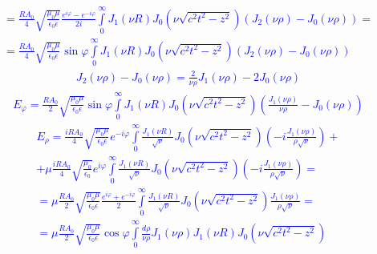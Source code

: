 %
\textcolor{blue} { \begin{equation*} \begin{aligned}
= \frac{R A_0}{4} \sqrt{\frac{\mu_0 \mu}{\epsilon_0 \epsilon}} 
\frac{e^{i \varphi} - e^{-i \varphi} }{2i} \int \limits_{0}^{\infty} 
J_1 (\nu R) J_0 \left( \nu \sqrt{c^2 t^2 - z^2} \right) 
\left( J_2 (\nu \rho) - J_0 (\nu \rho) \right) = \\
= \frac{R A_0}{4} \sqrt{\frac{\mu_0 \mu}{\epsilon_0 \epsilon}} \sin \varphi 
\int \limits_{0}^{\infty} J_1 (\nu R) 
J_0 \left( \nu \sqrt{c^2 t^2 - z^2} \right) 
\left( J_2 (\nu \rho) - J_0 (\nu \rho) \right)
\end{aligned} \end{equation*} }
%
\textcolor{blue} { \begin{equation*} \begin{aligned}
J_2 (\nu \rho) - J_0 (\nu \rho) = \frac{2}{\nu \rho} J_1 (\nu \rho) - 
2 J_0 (\nu \rho)
\end{aligned} \end{equation*} }
%
\textcolor{blue} { \begin{equation*} \begin{aligned}
E_\varphi = \frac{R A_0}{2} \sqrt{\frac{\mu_0 \mu}{\epsilon_0 \epsilon}}
\sin \varphi \int \limits_{0}^{\infty} J_1 (\nu R) 
J_0 \left( \nu \sqrt{c^2 t^2 - z^2} \right) 
\left( \frac{J_1 (\nu \rho)}{\nu \rho} - J_0 (\nu \rho) \right)
\end{aligned} \end{equation*} }
%
\textcolor{blue} { \begin{equation*} \begin{aligned}
E_\rho = \frac{i R A_0}{4} \sqrt{\frac{\mu_0 \mu}{\epsilon_0 \epsilon}}  
e^{- i \varphi} \int \limits_{0}^{\infty} \frac{J_1 (\nu R)}{\sqrt{\nu}} 
J_0 \left( \nu \sqrt{c^2 t^2 - z^2} \right) 
\left( - i \frac{J_1 (\nu \rho)}{\rho \sqrt{\nu}} \right) + \\
+ \mu \frac{i R A_0}{4} \sqrt{\frac{\mu_0}{\epsilon_0}}  e^{i \varphi}
\int \limits_{0}^{\infty} \frac{J_1 (\nu R)}{\sqrt{\nu}}
J_0 \left( \nu \sqrt{c^2 t^2 - z^2} \right) 
\left( - i \frac{J_1 (\nu \rho)}{ \rho \sqrt{\nu}} \right) = \\
= \mu \frac{R A_0}{2} \sqrt{\frac{\mu_0 \mu}{\epsilon_0 \epsilon}} 
\frac{e^{i \varphi} + e^{-i \varphi}}{2}
\int \limits_{0}^{\infty} \frac{J_1 (\nu R)}{\sqrt{\nu}}
J_0 \left( \nu \sqrt{c^2 t^2 - z^2} \right) 
\frac{J_1 (\nu \rho)}{ \rho \sqrt{\nu}} = \\
= \mu \frac{R A_0}{2} \sqrt{\frac{\mu_0 \mu}{\epsilon_0 \epsilon}} 
\cos \varphi \int \limits_{0}^{\infty} \frac{d \rho}{\nu \rho} 
J_1 (\nu \rho) J_1 (\nu R) J_0 \left( \nu \sqrt{c^2 t^2 - z^2} \right)
\end{aligned} \end{equation*} }
